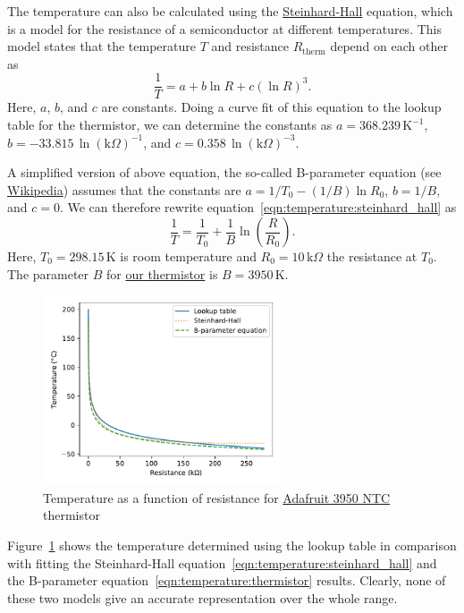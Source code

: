 The temperature can also be calculated using the \href{https://en.wikipedia.org/wiki/Steinhart%E2%80%93Hart_equation}{Steinhard-Hall} equation, which is a model for the resistance of a semiconductor at different temperatures. This model states that the temperature $T$ and resistance $R_\mathrm{therm}$ depend on each other as
\begin{equation}
    \frac{1}{T} = a + b\ln{R} + c \left(\ln{R}\right)^{3}. \label{eqn:temperature:steinhard_hall}
\end{equation}
Here, $a$, $b$, and $c$ are constants. Doing a curve fit of this equation to the lookup table for the thermistor, we can determine the constants as $a=368.239\,\mathrm{K}^{-1}$, $b=-33.815\,\ln({\mathrm{k}\Omega})^{-1}$, and $c=0.358\,\ln({\mathrm{k}\Omega})^{-3}$. 

A simplified version of above equation, the so-called B-parameter equation (see \href{https://en.wikipedia.org/wiki/Thermistor}{Wikipedia}) assumes that the constants are $a=1/T_0 - (1/B)\ln{R_0}$, $b=1/B$, and $c=0$. We can therefore rewrite equation~\eqref{eqn:temperature:steinhard_hall} as
\begin{equation}
    \frac{1}{T} = \frac{1}{T_0} + \frac{1}{B} \ln\left( \frac{R}{R_0} \right). \label{eqn:temperature:thermistor}
\end{equation}
Here, $T_0 = 298.15\,$K is room temperature and $R_0 = 10\,\mathrm{k}\Omega$ the resistance at $T_0$. The parameter $B$ for \href{https://www.adafruit.com/product/372}{our thermistor} is $B=3950\,$K.

\begin{figure}[tbh]
    \centering
    \includegraphics[width=0.625\textwidth]{graphics/03_temperature/thermistor.pdf}
    \caption{Temperature as a function of resistance for \href{https://www.adafruit.com/product/372}{Adafruit 3950 NTC} thermistor}
    \label{fig:temperature:thermistor}
\end{figure}
Figure~\ref{fig:temperature:thermistor} shows the temperature determined using the lookup table in comparison with fitting the Steinhard-Hall equation~\eqref{eqn:temperature:steinhard_hall} and the B-parameter equation~\eqref{eqn:temperature:thermistor} results. Clearly, none of these two models give an accurate representation over the whole range.

